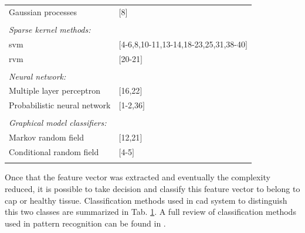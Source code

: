 \begin{table}
\begin{tabular}{p{.60\linewidth} p{.30\linewidth}}
		\quad Gaussian processes & $[$8$]$ \\ \\ [-1.5ex]
		\textit{Sparse kernel methods:} & \\
		\quad \acs{svm} & $[$4-6,8,10-11,13-14,18-23,25,31,38-40$]$ \\
		\quad \acs{rvm} & $[$20-21$]$ \\ \\ [-1.5ex]
		\textit{Neural network:} & \\ 
		\quad Multiple layer perceptron & $[$16,22$]$ \\
		\quad Probabilistic neural network & $[$1-2,36$]$ \\ \\ [-1.5ex]
		\textit{Graphical model classifiers:} & \\
		\quad Markov random field & $[$12,21$]$ \\
		\quad Conditional random field & $[$4-5$]$ \\ \\ [-1.5ex]
		\hline
	\end{tabular}
	\label{tab:class}
\end{table}

Once that the feature vector was extracted and eventually the complexity reduced, it is possible to take decision and classify this feature vector to belong to \ac{cap} or healthy tissue. Classification methods used in \ac{cad} system to distinguish this two classes are summarized in Tab. \ref{tab:class}. A full review of classification methods used in pattern recognition can be found in \cite{Bishop2006}.

